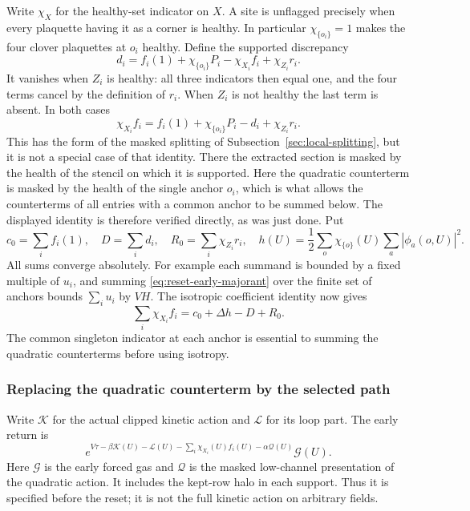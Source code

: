 Write $\chi_X$ for the healthy-set indicator on $X$. A site is
unflagged precisely when every plaquette having it as a corner is
healthy. In particular $\chi_{\{o_i\}}=1$ makes the four clover
plaquettes at $o_i$ healthy.
Define the supported discrepancy
\[
 d_i=f_i(1)+\chi_{\{o_i\}}P_i-\chi_{X_i}f_i
                                  +\chi_{Z_i}r_i.
\]
It vanishes when $Z_i$ is healthy: all three indicators then equal
one, and the four terms cancel by the definition of $r_i$. When
$Z_i$ is not healthy the last term is absent. In both cases
\[
 \chi_{X_i}f_i=f_i(1)+\chi_{\{o_i\}}P_i-d_i+\chi_{Z_i}r_i .
\]
This has the form of the masked splitting of
Subsection~\ref{sec:local-splitting}, but it is not a special case of
that identity. There the extracted section is masked by the health
of the stencil on which it is supported. Here the quadratic
counterterm is masked by the health of the single anchor $o_i$,
which is what allows the counterterms of all entries with a common
anchor to be summed below. The displayed identity is therefore
verified directly, as was just done. Put
\[
 c_0=\sum_i f_i(1),\quad D=\sum_i d_i,\quad
 R_0=\sum_i\chi_{Z_i}r_i,\quad
 h(U)=\frac12\sum_o\chi_{\{o\}}(U)\sum_a|\phi_a(o,U)|^2.
\]
All sums converge absolutely. For example each summand is bounded by
a fixed multiple of $u_i$, and summing
\eqref{eq:reset-early-majorant} over the finite set of anchors bounds
$\sum_i u_i$ by $VH$. The isotropic coefficient identity now gives
\begin{equation}\label{eq:reset-first-split}
                \sum_i\chi_{X_i}f_i=c_0+\Delta h-D+R_0.
\end{equation}
The common singleton indicator at each anchor is essential to summing
the quadratic counterterms before using isotropy.

\subsubsection{Replacing the quadratic counterterm by the selected path}
Write $\mathcal K$ for the actual clipped kinetic action and
$\mathcal L$ for its loop part. The early return is
\begin{equation}\label{eq:reset-early-density}
 e^{V\tau-\beta\mathcal K(U)-\mathcal L(U)
             -\sum_i\chi_{X_i}(U)f_i(U)-\alpha\mathcal Q(U)}
                            \mathcal G(U).
\end{equation}
Here $\mathcal G$ is the early forced gas and $\mathcal Q$ is the
masked low-channel presentation of the quadratic action. It includes
the kept-row halo in each support. Thus it is specified before the
reset; it is not the full kinetic action on arbitrary fields.

